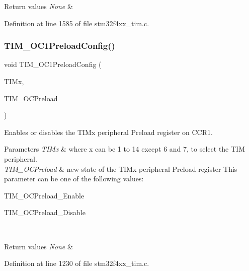 \begin{DoxyRetVals}{Return values}
{\em None} & \\
\hline
\end{DoxyRetVals}


Definition at line 1585 of file stm32f4xx\+\_\+tim.\+c.

\mbox{\label{group___t_i_m_ga60e6c29ad8f919bef616cf8e3306dd64}} 
\subsubsection{\texorpdfstring{T\+I\+M\+\_\+\+O\+C1\+Preload\+Config()}{TIM\_OC1PreloadConfig()}}
{\footnotesize\ttfamily void T\+I\+M\+\_\+\+O\+C1\+Preload\+Config (\begin{DoxyParamCaption}\item[{\hyperlink{struct_t_i_m___type_def}{T\+I\+M\+\_\+\+Type\+Def} $\ast$}]{T\+I\+Mx,  }\item[{uint16\+\_\+t}]{T\+I\+M\+\_\+\+O\+C\+Preload }\end{DoxyParamCaption})}



Enables or disables the T\+I\+Mx peripheral Preload register on C\+C\+R1. 


\begin{DoxyParams}{Parameters}
{\em T\+I\+Mx} & where x can be 1 to 14 except 6 and 7, to select the T\+IM peripheral. \\
\hline
{\em T\+I\+M\+\_\+\+O\+C\+Preload} & new state of the T\+I\+Mx peripheral Preload register This parameter can be one of the following values\+: \begin{DoxyItemize}
\item T\+I\+M\+\_\+\+O\+C\+Preload\+\_\+\+Enable \item T\+I\+M\+\_\+\+O\+C\+Preload\+\_\+\+Disable \end{DoxyItemize}
\\
\hline
\end{DoxyParams}

\begin{DoxyRetVals}{Return values}
{\em None} & \\
\hline
\end{DoxyRetVals}


Definition at line 1230 of file stm32f4xx\+\_\+tim.\+c.

